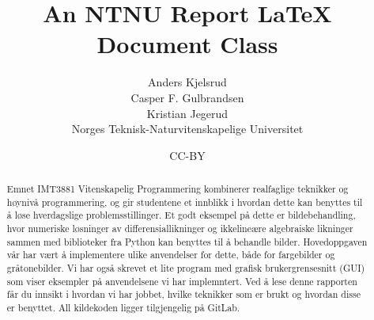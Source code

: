 \documentclass[british]{ntnureport}
\title{An NTNU Report \LaTeX{} Document Class}
\author{Anders Kjelsrud \\
        Casper F. Gulbrandsen \\
		Kristian Jegerud \\ 
		Norges Teknisk-Naturvitenskapelige Universitet }
\date{CC-BY \ntnureportdate}
\begin{document}
\begin{abstract}
    Emnet IMT3881 Vitenskapelig Programmering kombinerer realfaglige teknikker og høynivå programmering, og 
    gir studentene et innblikk i hvordan dette kan benyttes til å løse hverdagslige problemsstillinger. Et godt 
    eksempel på dette er bildebehandling, hvor numeriske løsninger av differensiallikninger og ikkelineære algebraiske
    likninger sammen med biblioteker fra Python kan benyttes til å behandle bilder. Hovedoppgaven vår har vært å
    implementere ulike anvendelser for dette, både for fargebilder og gråtonebilder. Vi har også skrevet et lite
    program med grafisk brukergrensesnitt (GUI) som viser eksempler på anvendelsene vi har implemntert. Ved å lese
    denne rapporten får du innsikt i hvordan vi har jobbet, hvilke teknikker som er brukt og hvordan disse er
    benyttet. All kildekoden ligger tilgjengelig på GitLab\cite{gitsource}. 
\end{abstract}







\appendix


\end{document}
